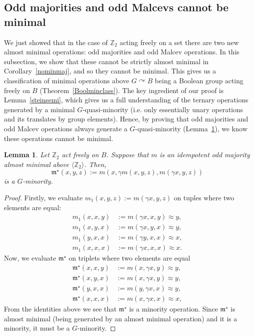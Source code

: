 \documentclass{article}
\newtheorem{lemma}[theorem]{Lemma}
\theoremstyle{remark}
\theoremstyle{definition}
\def\acts{\curvearrowright}
\begin{document}
\subsection{Odd majorities and odd Malcevs cannot be minimal}\label{sub:noalmostminodd}
We just showed that in the case of $\mathbb{Z}_2$ acting freely on a set there are two new almost minimal operations: odd majorities and odd Malcev operations. In this subsection, we show that these cannot be strictly almost minimal in Corollary~\ref{nominmaj}, and so they cannot be minimal. This gives us a classification of minimal operations above $G\acts B$ being a Boolean group acting freely on $B$ (Theorem~\ref{Boolminclass}). The key ingredient of our proof is Lemma~\ref{steinsemi}, which gives us a full understanding of the ternary operations generated by a minimal $G$-quasi-minority (i.e. only essentially unary operations and its translates by group elements). Hence, by proving that odd majorities and odd Malcev operations always generate a $G$-quasi-minority (Lemma~\ref{genmin}), we know these operations cannot be minimal.



\begin{lemma}\label{genmin} Let $\mathbb{Z}_2$ act freely on $B$. Suppose that $m$ is an idempotent odd majority almost minimal above $\langle \mathbb{Z}_2\rangle$. Then, 
\[\mathfrak{m}^\star(x,y,z):= m(x, \gamma m(x,y,z), m(\gamma x, y, z))\]
is a $G$-minority.
\end{lemma}
\begin{proof} Firstly, we evaluate $m_1(x,y,z):=m(\gamma x,y,z)$ on tuples where two elements are equal:
\begin{align*}
m_1(x,x,y)&:=m(\gamma x, x,y)\approx y,\\
m_1(x,y, x)&:=m(\gamma x, y,x)\approx y,\\
    m_1(y,x,x)&:=m(\gamma y, x,x)\approx x,\\
      m_1(x,x,x)&:=m(\gamma x, x,x)\approx x.
\end{align*}
    Now, we evaluate $\mathfrak{m}^\star$ on triplets where two elements are equal
  \begin{align*}
\mathfrak{m}^\star(x,x,y)&:= m(x,\gamma x, y)\approx y,\\
\mathfrak{m}^\star(x,y, x)&:= m(x,\gamma x, y)\approx  y,\\
    \mathfrak{m}^\star(y,x,x)&:= m(y, \gamma x, x)\approx  y,\\
    \mathfrak{m}^\star(x,x,x)&:= m(x, \gamma x, x)\approx x,
\end{align*}
From the identities above we see that $\mathfrak{m}^\star$ is a minority operation. 
Since $\mathfrak{m}^\star$ is almost minimal (being generated by an almost minimal operation) and it is a minority, it must be a $G$-minority.
\end{proof}
\end{document}
